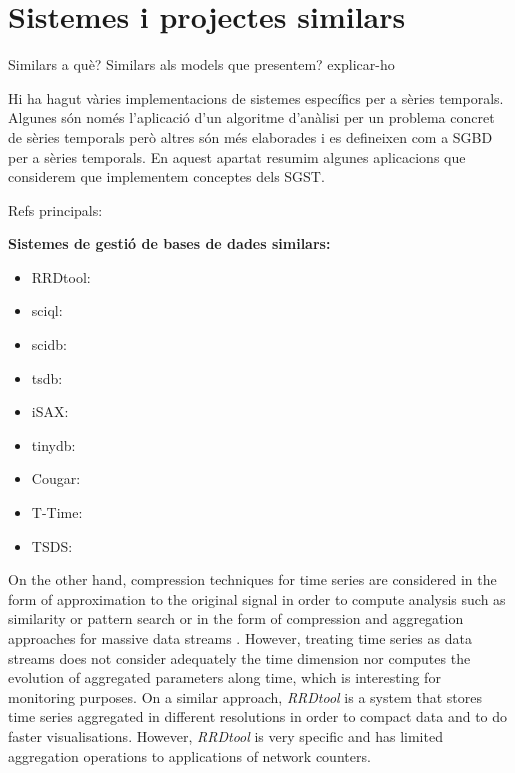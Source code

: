 
\section{Sistemes i projectes similars}




Similars a què? Similars als models que presentem? explicar-ho


Hi ha hagut vàries implementacions de sistemes específics per a sèries
temporals. Algunes són només l'aplicació d'un algoritme d'anàlisi per
un problema concret de sèries temporals però altres són més elaborades
i es defineixen com a SGBD per a sèries temporals.  En aquest apartat
resumim algunes aplicacions que considerem que implementem conceptes
dels SGST.






Refs principals\todo{}:





\textbf{Sistemes de gestió de bases de dades similars:}
\begin{itemize}
\item RRDtool: \cite{lisa98:oetiker,rrdtool}
\item sciql: \cite{sciql,zhang11,kersten11}
\item scidb: \cite{stonebraker09:scidb,scidb}
\item tsdb: \cite{deri12:tsdb_compressed_database}
\item iSAX: \cite{keogh10:isax,keogh08:isax}
\item tinydb: %
\item Cougar: %
\item T-Time: %
\item TSDS: %
\end{itemize}

On the other hand, compression techniques for time series are
considered in the form of approximation to the original signal in
order to compute analysis such as similarity or pattern search
\cite{fu11,keogh01,last01} or in the form of compression and
aggregation approaches for massive data streams
\cite{cormode08:pods,bonnet01}. However, treating time series as data
streams does not consider adequately the time dimension nor computes
the evolution of aggregated parameters along time, which is
interesting for monitoring purposes.  On a similar approach,
\emph{RRDtool} \cite{rrdtool} is a system that stores time series
aggregated in different resolutions in order to compact data and to do
faster visualisations. However, \emph{RRDtool} is very specific and
has limited aggregation operations to applications of network
counters.




